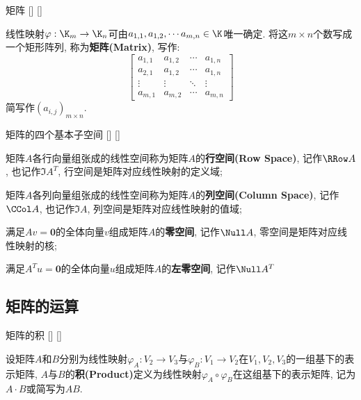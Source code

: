 \documentclass[UTF8]{ctexart}
\begin{document}
		\begin{dfn}
			[]
			{矩阵}
			[]
			[]

			线性映射$\varphi:\K_m\to \K_n$可由$a_{1,1},a_{1,2},\cdots a_{m,n}\in\K$唯一确定. 将这$m\times n$个数写成一个矩形阵列, 称为\textbf{矩阵(Matrix)}, 写作: 
			$$\begin{bmatrix}
				a_{1,1}&a_{1,2}&\cdots&a_{1,n}\\
				a_{2,1}&a_{1,2}&\cdots&a_{1,n}\\
				\vdots&\vdots&\ddots&\vdots\\
				a_{m,1}&a_{m,2}&\cdots&a_{m,n}
			\end{bmatrix}$$
			简写作$(a_{i,j})_{m\times n}$. 
		\end{dfn}
		
		\begin{dfn}
			[]
			{矩阵的四个基本子空间}
			[]
			[]

			矩阵$A$各行向量组张成的线性空间称为矩阵$A$的\textbf{行空间(Row Space)}, 记作$\RRow A$, 也记作$\Im A^T$, 行空间是矩阵对应线性映射的定义域; 
			
			矩阵$A$各列向量组张成的线性空间称为矩阵$A$的\textbf{列空间(Column Space)}, 记作$\CCol A$, 也记作$\Im A$, 列空间是矩阵对应线性映射的值域; 

			满足$Av=\mathbf{0}$的全体向量$v$组成矩阵$A$的\textbf{零空间}, 记作$\Null A$, 零空间是矩阵对应线性映射的核; 

			满足$A^T u=\mathbf{0}$的全体向量$u$组成矩阵$A$的\textbf{左零空间}, 记作$\Null A^T$
		\end{dfn}
	
	\subsection{矩阵的运算}
		\begin{dfn}
			[]
			{矩阵的积}
			[]
			[]

			设矩阵$A$和$B$分别为线性映射$\varphi_A: V_2\to V_3$与$\varphi_B:V_1\to V_2$在$V_1,V_2,V_3$的一组基下的表示矩阵, $A$与$B$的\textbf{积(Product)}定义为线性映射$\varphi_A\circ\varphi_B$在这组基下的表示矩阵, 记为$A\cdot B$或简写为$AB$. 
		\end{dfn}
		
\end{document}

